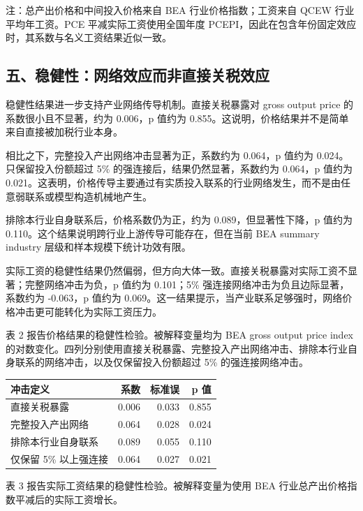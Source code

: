 \documentclass[
]{ctexart}
\newcounter{none} %
\begin{document}
注：总产出价格和中间投入价格来自 BEA 行业价格指数；工资来自 QCEW
行业平均年工资。PCE 平减实际工资使用全国年度
PCEPI，因此在包含年份固定效应时，其系数与名义工资结果近似一致。

\subsection{五、稳健性：网络效应而非直接关税效应}\label{ux4e94ux7a33ux5065ux6027ux7f51ux7edcux6548ux5e94ux800cux975eux76f4ux63a5ux5173ux7a0eux6548ux5e94}

稳健性结果进一步支持产业网络传导机制。直接关税暴露对 gross output price
的系数很小且不显著，约为 0.006，p 值约为
0.855。这说明，价格结果并不是简单来自直接被加税行业本身。

相比之下，完整投入产出网络冲击显著为正，系数约为 0.064，p 值约为
0.024。只保留投入份额超过 5\% 的强连接后，结果仍然显著，系数约为
0.064，p 值约为
0.021。这表明，价格传导主要通过有实质投入联系的行业网络发生，而不是由任意弱联系或模型构造机械地产生。

排除本行业自身联系后，价格系数仍为正，约为 0.089，但显著性下降，p 值约为
0.110。这个结果说明跨行业上游传导可能存在，但在当前 BEA summary industry
层级和样本规模下统计功效有限。

实际工资的稳健性结果仍然偏弱，但方向大体一致。直接关税暴露对实际工资不显著；完整网络冲击为负，p
值约为 0.101；5\% 强连接网络冲击为负且边际显著，系数约为 -0.063，p
值约为
0.069。这一结果提示，当产业联系足够强时，网络价格冲击更可能转化为实际工资压力。

表 2 报告价格结果的稳健性检验。被解释变量均为 BEA gross output price
index
的对数变化。四列分别使用直接关税暴露、完整投入产出网络冲击、排除本行业自身联系的网络冲击，以及仅保留投入份额超过
5\% 的强连接网络冲击。

{\def\LTcaptype{none} %
\begin{longtable}[]{@{}lrrr@{}}
\toprule\noalign{}
冲击定义 & 系数 & 标准误 & p 值 \\
\midrule\noalign{}
\endhead
\bottomrule\noalign{}
\endlastfoot
直接关税暴露 & 0.006 & 0.033 & 0.855 \\
完整投入产出网络 & 0.064 & 0.028 & 0.024 \\
排除本行业自身联系 & 0.089 & 0.055 & 0.110 \\
仅保留 5\% 以上强连接 & 0.064 & 0.027 & 0.021 \\
\end{longtable}
}

表 3 报告实际工资结果的稳健性检验。被解释变量为使用 BEA
行业总产出价格指数平减后的实际工资增长。
\end{document}
